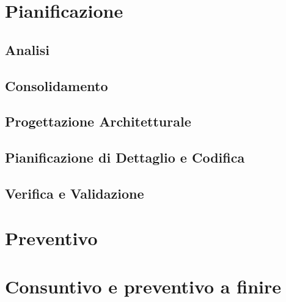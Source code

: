 \documentclass[a4paper, oneside, openany, dvipsnames, table]{article}
\begin{document}
\section{Pianificazione}
	
	\subsection{Analisi}
			
	\subsection{Consolidamento}
		
	\subsection{Progettazione Architetturale}
		
	\subsection{Pianificazione di Dettaglio e Codifica}
		
	\subsection{Verifica e Validazione}
		
\newpage
\section{Preventivo}
\newpage
\section{Consuntivo e preventivo a finire}
\end{document}
